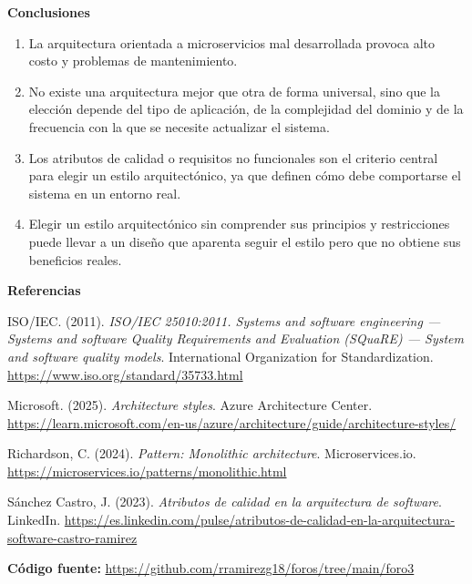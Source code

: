 \documentclass[12pt,letterpaper]{article}
\newcommand{\subtitulo}[1]{\vspace{12pt}\noindent\textbf{#1}\par\vspace{10pt}}
\begin{document}
\subtitulo{Conclusiones}
\begin{enumerate}[label=\arabic*., left=0pt, itemsep=2pt]
\item La arquitectura orientada a microservicios mal desarrollada provoca alto costo y problemas de mantenimiento.
\item No existe una arquitectura mejor que otra de forma universal, sino que la elección depende del tipo de aplicación, de la complejidad del dominio y de la frecuencia con la que se necesite actualizar el sistema.
\item Los atributos de calidad o requisitos no funcionales son el criterio central para elegir un estilo arquitectónico, ya que definen cómo debe comportarse el sistema en un entorno real.
\item Elegir un estilo arquitectónico sin comprender sus principios y restricciones puede llevar a un diseño que aparenta seguir el estilo pero que no obtiene sus beneficios reales.
\end{enumerate}
 
\subtitulo{Referencias}
 
\hangindent=1cm \noindent ISO/IEC. (2011). \textit{ISO/IEC 25010:2011. Systems and software engineering — Systems and software Quality Requirements and Evaluation (SQuaRE) — System and software quality models}. International Organization for Standardization. \url{https://www.iso.org/standard/35733.html}
 
\vspace{4pt}
\hangindent=1cm \noindent Microsoft. (2025). \textit{Architecture styles}. Azure Architecture Center. \url{https://learn.microsoft.com/en-us/azure/architecture/guide/architecture-styles/}
 
\vspace{4pt}
\hangindent=1cm \noindent Richardson, C. (2024). \textit{Pattern: Monolithic architecture}. Microservices.io. \url{https://microservices.io/patterns/monolithic.html}
 
\vspace{4pt}
\hangindent=1cm \noindent Sánchez Castro, J. (2023). \textit{Atributos de calidad en la arquitectura de software}. LinkedIn. \url{https://es.linkedin.com/pulse/atributos-de-calidad-en-la-arquitectura-software-castro-ramirez}

\vspace{14pt}
\noindent\small \textbf{Código fuente:}  \url{https://github.com/rramirezg18/foros/tree/main/foro3}
\end{document}
